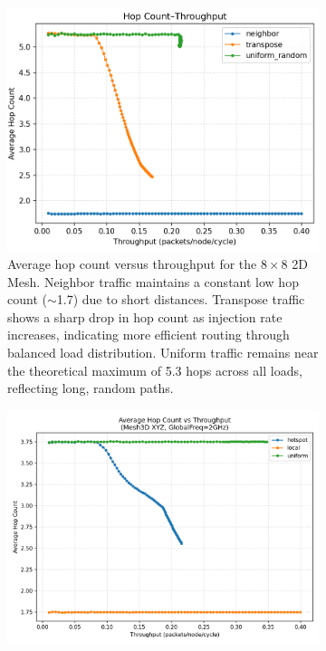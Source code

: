 \documentclass[11pt]{article}
\begin{document}
\begin{figure}[htbp]
    \vspace{1em} %
    
    \begin{subfigure}[t]{0.45\linewidth}
        \centering
        \includegraphics[width=\linewidth]{./figs/Mesh2D_throughput_hops.png}
        \caption{Average hop count versus throughput for the $8{\times}8$ 2D Mesh. Neighbor traffic maintains a constant low hop count ($\sim$1.7) due to short distances. Transpose traffic shows a sharp drop in hop count as injection rate increases, indicating more efficient routing through balanced load distribution. Uniform traffic remains near the theoretical maximum of 5.3 hops across all loads, reflecting long, random paths.}
        \label{fig:mesh2d-hops}
    \end{subfigure}
    \hfill
    \begin{subfigure}[t]{0.45\linewidth}
        \centering
        \includegraphics[width=\linewidth]{./figs/Mesh3D_throughput_hops.png}

\end{subfigure}
\end{figure}
\end{document}
